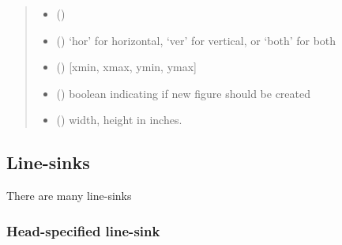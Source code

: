 \documentclass[letterpaper,10pt,english]{sphinxmanual}
\begin{document}
\begin{fulllineitems}
\begin{fulllineitems}
\begin{quote}
\begin{description}
\begin{itemize}
\item {} 
 () \textendash{} 

\item {} 
 () \textendash{} ‘hor’ for horizontal, ‘ver’ for vertical, or ‘both’ for both

\item {} 
 (\sphinxstyleliteralemphasis{ (}\sphinxstyleliteralemphasis{)}) \textendash{} {[}xmin, xmax, ymin, ymax{]}

\item {} 
 (\sphinxstyleliteralemphasis{ (}\sphinxstyleliteralemphasis{)}) \textendash{} boolean indicating if new figure should be created

\item {} 
 (\sphinxstyleliteralemphasis{, }\sphinxstyleliteralemphasis{, }) \textendash{} width, height in inches.

\end{itemize}

\end{description}\end{quote}

\end{fulllineitems}


\end{fulllineitems}



\subsection{Line-sinks}
\label{\detokenize{linesinks/linesinkindex::doc}}\label{\detokenize{linesinks/linesinkindex:line-sinks}}
There are many line-sinks


\subsubsection{Head-specified line-sink}
\label{\detokenize{linesinks/headlinesink:head-specified-line-sink}}\label{\detokenize{linesinks/headlinesink::doc}}
\end{document}
